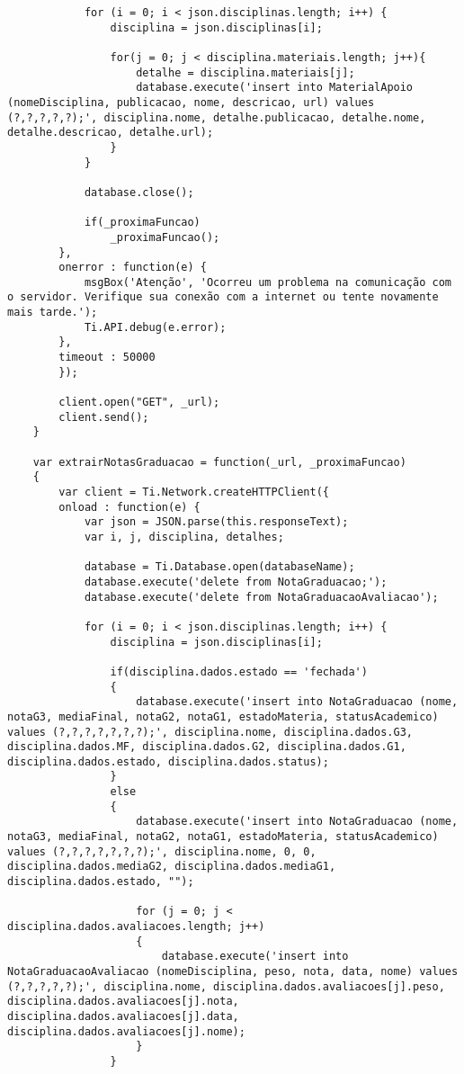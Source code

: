 \begin{lstlisting}
			for (i = 0; i < json.disciplinas.length; i++) {
				disciplina = json.disciplinas[i];

				for(j = 0; j < disciplina.materiais.length; j++){
					detalhe = disciplina.materiais[j];
					database.execute('insert into MaterialApoio (nomeDisciplina, publicacao, nome, descricao, url) values (?,?,?,?,?);', disciplina.nome, detalhe.publicacao, detalhe.nome, detalhe.descricao, detalhe.url);
				}
			}
			
			database.close();
			
     		if(_proximaFuncao)	
     			_proximaFuncao();         			
    	},
     	onerror : function(e) {
     		msgBox('Atenção', 'Ocorreu um problema na comunicação com o servidor. Verifique sua conexão com a internet ou tente novamente mais tarde.');
         	Ti.API.debug(e.error);
    	},
     	timeout : 50000 
 		});
 	
		client.open("GET", _url);
 		client.send();  
 	}
 	
 	var extrairNotasGraduacao = function(_url, _proximaFuncao)
 	{
 		var client = Ti.Network.createHTTPClient({
    	onload : function(e) {
    		var json = JSON.parse(this.responseText);
			var i, j, disciplina, detalhes;
			
			database = Ti.Database.open(databaseName);
			database.execute('delete from NotaGraduacao;');
			database.execute('delete from NotaGraduacaoAvaliacao');
			
			for (i = 0; i < json.disciplinas.length; i++) {
				disciplina = json.disciplinas[i];

				if(disciplina.dados.estado == 'fechada')
				{
					database.execute('insert into NotaGraduacao (nome, notaG3, mediaFinal, notaG2, notaG1, estadoMateria, statusAcademico) values (?,?,?,?,?,?,?);', disciplina.nome, disciplina.dados.G3, disciplina.dados.MF, disciplina.dados.G2, disciplina.dados.G1, disciplina.dados.estado, disciplina.dados.status);
				}
				else
				{
					database.execute('insert into NotaGraduacao (nome, notaG3, mediaFinal, notaG2, notaG1, estadoMateria, statusAcademico) values (?,?,?,?,?,?,?);', disciplina.nome, 0, 0, disciplina.dados.mediaG2, disciplina.dados.mediaG1, disciplina.dados.estado, "");
					
					for (j = 0; j < disciplina.dados.avaliacoes.length; j++)
					{
						database.execute('insert into NotaGraduacaoAvaliacao (nomeDisciplina, peso, nota, data, nome) values (?,?,?,?,?);', disciplina.nome, disciplina.dados.avaliacoes[j].peso, disciplina.dados.avaliacoes[j].nota, disciplina.dados.avaliacoes[j].data, disciplina.dados.avaliacoes[j].nome);
					}
				}
				

\end{lstlisting}
